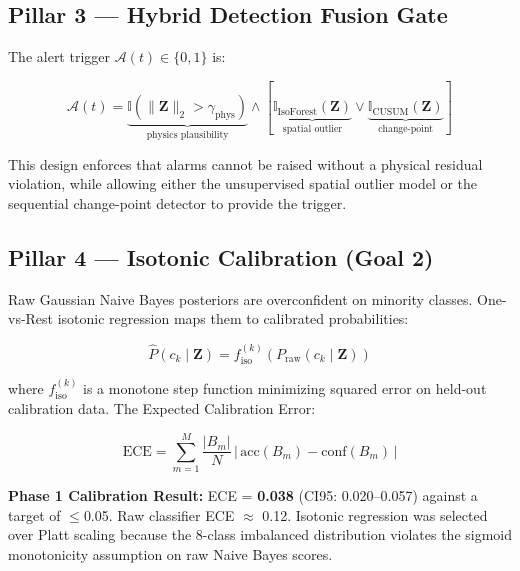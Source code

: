 \documentclass[12pt, a4paper]{article}
\begin{document}
\subsection{Pillar 3 — Hybrid Detection Fusion Gate}

The alert trigger $\mathcal{A}(t) \in \{0,1\}$ is:

\begin{equation}
\mathcal{A}(t) = \underbrace{\mathbb{I}\!\left(\|\mathbf{Z}\|_2 > \gamma_{\text{phys}}\right)}_{\text{physics plausibility}} \wedge \left[\underbrace{\mathbb{I}_{\text{IsoForest}}(\mathbf{Z})}_{\text{spatial outlier}} \vee \underbrace{\mathbb{I}_{\text{CUSUM}}(\mathbf{Z})}_{\text{change-point}}\right]
\end{equation}

This design enforces that alarms cannot be raised without a physical residual violation, while allowing either the unsupervised spatial outlier model or the sequential change-point detector to provide the trigger.

\subsection{Pillar 4 — Isotonic Calibration (Goal 2)}

Raw Gaussian Naive Bayes posteriors are overconfident on minority classes. One-vs-Rest isotonic regression maps them to calibrated probabilities:

\begin{equation}
\hat{P}(c_k\mid\mathbf{Z}) = f_{\text{iso}}^{(k)}\!\left(P_{\text{raw}}(c_k\mid\mathbf{Z})\right)
\end{equation}

where $f_{\text{iso}}^{(k)}$ is a monotone step function minimizing squared error on held-out calibration data. The Expected Calibration Error:

\begin{equation}
\text{ECE} = \sum_{m=1}^M \frac{|B_m|}{N}\,\bigl|\,\mathrm{acc}(B_m) - \mathrm{conf}(B_m)\,\bigr|
\end{equation}

\begin{tcolorbox}[resultbox]
\textbf{Phase 1 Calibration Result:} ECE = \textbf{0.038} (CI95: 0.020–0.057) against a target of $\le$0.05. Raw classifier ECE $\approx$ 0.12. Isotonic regression was selected over Platt scaling because the 8-class imbalanced distribution violates the sigmoid monotonicity assumption on raw Naive Bayes scores.
\end{tcolorbox}
\end{document}

